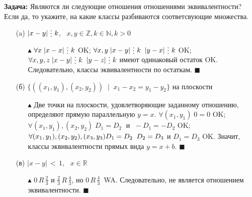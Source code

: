 \textbf{Задача:} Являются ли следующие отношения отношениями эквивалентности? Если да, то укажите, на какие классы разбиваются соответсвующие множества.
\begin{enumerate}
    \item[(a)] $|x-y| \, \svdots \, k$, \, $x,y \in \mathbb{Z}, k \in \mathbb{N}, k > 0$
    \begin{itemize}
        \item[$\blacktriangle$] $\forall x \;|x-x| \, \svdots \, k$ {\color{ForestGreen}OK}; \quad $\forall x,y \;|x-y| \, \svdots \, k \;\; |y-x| \, \svdots \, k$ {\color{ForestGreen}OK}; \quad $\forall x,y,z \;|x-y| \, \svdots \, k \;\; |y-z| \, \svdots \, k$ имеют одинаковый остаток {\color{ForestGreen}OK}. Следовательно, классы эквивалентности по остаткам. $\blacksquare$
    \end{itemize}
    
    \item[(б)] $\{ ((x_1, y_1), (x_2,y_2)) \;\; | \;\; x_1-x_2 = y_1-y_2 \}$ на плоскости
    \begin{itemize}
        \item[$\blacktriangle$] Две точки на плоскости, удовлетворяющие заданному отношению, определяют прямую параллельную $y=x$. $\forall (x_1, y_1) \;0 = 0$ {\color{ForestGreen}OK}; \quad $\forall (x_1, y_1), (x_2,y_2) \; D_1 = D_2 \;$ и $\; -D_1=-D_2$ {\color{ForestGreen}OK}; \quad $\forall (x_1, y_1), (x_2,y_2), (x_3,y_3) \newline D_1=D_2 \;\; D_2=D_3$ и $D_1=D_3$ {\color{ForestGreen}OK}. Значит, классы эквивалентности прямых вида $y = x + b$. $\blacksquare$
    \end{itemize}
    
    \item[(в)] $|x-y| \, < \, 1$, \, $x \in \mathbb{R}$
    \begin{itemize}
        \item[$\blacktriangle$] $0 \, R \, \frac{2}{3}$ и $\frac{2}{3} \, R \, \frac{4}{3}$, но $0 \, R \, \frac{4}{3} \,$ {\color{Red}WA}. Следовательно, не является отношением эквивалентности. $\blacksquare$
    \end{itemize}
    

\end{enumerate}
